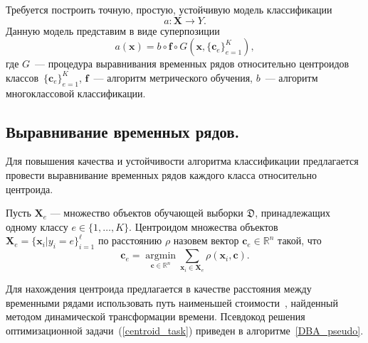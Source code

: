 Требуется построить точную, простую, устойчивую модель классификации
\[
a: \mathbf{X} \to Y.
\]
Данную модель представим в виде суперпозиции
\begin{equation}
\label{eq:classifiers}
a(\mathbf{x}) = b \circ \mathbf{f} \circ G(\mathbf{x}, \{\mathbf{c}_e\}_{e = 1} ^ K),
\end{equation}
где $G$~--- процедура выравнивания временных рядов относительно центроидов классов~$\{\mathbf{c}_e\}_{e = 1} ^ K$, $\mathbf{f}$~--- алгоритм метрического обучения, $b$~--- алгоритм многоклассовой классификации.

\subsection{Выравнивание временных рядов.}

Для повышения качества и устойчивости алгоритма классификации предлагается провести выравнивание временных рядов каждого класса относительно центроида.

Пусть $\mathbf{X}_e$ --- множество объектов обучающей выборки $\mathfrak{D}$, принадлежащих одному классу $e \in \{1, \dots, K\}$.
Центроидом множества объектов $\mathbf{X}_e = \{\mathbf{x}_i|y_i=e\}_{i=1}^\ell$ по расстоянию $\rho$ назовем вектор $\mathbf{c}_e \in \mathbb{R}^n$ такой, что
\begin{equation}
\label{centroid_task}
\mathbf{c}_e = \mathop{\text{argmin}}\limits_{{\mathbf{c} \in \mathbb{R}^n}}\sum_{\mathbf{x}_i \in \mathbf{X}_e}
{\rho(\mathbf{x}_i ,\mathbf{c})}.
\end{equation}

Для нахождения центроида предлагается в качестве расстояния между временными рядами использовать путь наименьшей стоимости~\cite{goncharov2015cost}, найденный методом динамической трансформации времени.
Псевдокод решения оптимизационной задачи~(\ref{centroid_task}) приведен в алгоритме~\ref{DBA_pseudo}.

